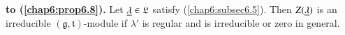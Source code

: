 \setcounter{prop}{10}
\begin{coro}\label{chap6:coro6.11}
{\bf to (\ref{chap6:prop6.8}).} Let $\underline{\lambda} \in \mathfrak{L}$
satisfy (\ref{chap6:subsec6.5}). Then 
$Z(\underline{\lambda})$ is an irreducible $(\mathfrak{g},
\mathfrak{t})$-module if $\lambda'$ is regular and is irreducible or
zero in general.
\end{coro}
